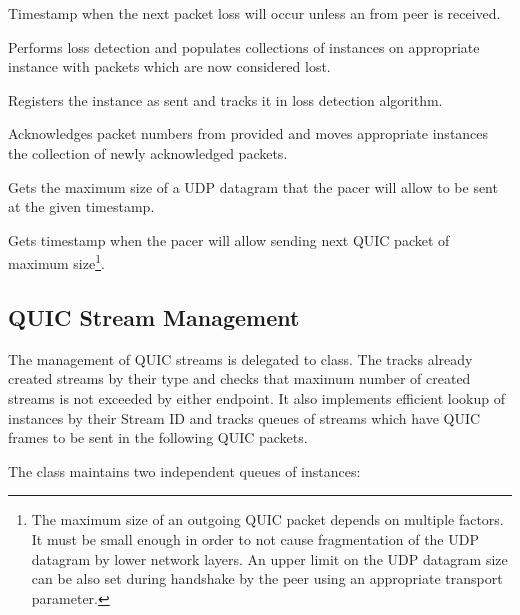 \begin{description}

        Timestamp when the next packet loss will occur unless an \ACK{} from peer is received.

        Performs loss detection and populates collections of \SentPacket{} instances on appropriate \PacketNumberSpace{} instance with packets which are now considered lost.

        Registers the \SentPacket{} instance as sent and tracks it in loss detection algorithm.

        Acknowledges packet numbers from provided \RangeSet{} and moves appropriate \SentPacket{} instances the collection of newly acknowledged packets.

        Gets the maximum size of a UDP datagram that the pacer will allow to be sent at the given timestamp.

        Gets timestamp when the pacer will allow sending next QUIC packet of maximum size\footnote{The maximum size of an outgoing QUIC packet depends on multiple factors. It must be small enough in order to not cause fragmentation of the UDP datagram by lower network layers. An upper limit on the UDP datagram size can be also set during handshake by the peer using an appropriate transport parameter.}.

\end{description}

\subsection{QUIC Stream Management}

The management of QUIC streams is delegated to \StreamCollection{} class. The \StreamCollection{}
tracks already created streams by their type and checks that maximum number of created streams is
not exceeded by either endpoint. It also implements efficient lookup of \ManagedQuicStream{}
instances by their Stream ID and tracks queues of streams which have QUIC frames to be sent in the
following QUIC packets.

The \StreamCollection{} class maintains two independent queues of \ManagedQuicStream{} instances:

